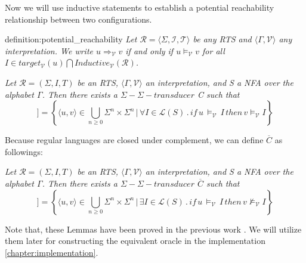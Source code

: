 Now we will use inductive statements to establish a potential reachability relationship between two configurations.

\begin{theo}{definition:potential_reachability}
    \textit{
   Let $\mathcal{R} = \langle \Sigma, \mathcal{I}, \mathcal{T} \rangle$ be any \textit{RTS}
   and $\langle \Gamma, \mathcal{V} \rangle$ any interpretation.
   We write $u \Rightarrow_{\mathcal{V}} v$ if and only if $u \models_{\mathcal{V}} v$
   for all $I \in target_\mathcal{V}(u) \bigcap Inductive_\mathcal{V}(\mathcal{R})$.
   }
\end{theo}

\begin{lemma}\label{lemma:abstractly_reachable}
    
\end{lemma}
\textit{
    Let $\mathcal{R} = (\Sigma, I, T)$ be an RTS, $\langle \Gamma, \mathcal{V} \rangle$ an interpretation, 
    and S a NFA over the alphabet $\Gamma$. Then there exists a  $\Sigma-\Sigma-transducer$ C such that
}
\begin{equation}
    [[C]] = \left\lbrace \langle u,v\rangle \in \bigcup_{n \geq 0} \Sigma^n \times \Sigma^n \, | \, \forall I \in \mathcal{L}(S) \, . \, if \, u \, \models_{\mathcal{V}} \, I \, then \, v \models_{\mathcal{V}} I \right\rbrace
\end{equation}

Because regular languages are closed under complement, we can define $\overline{C}$ as followings:
\begin{lemma}\label{lemma:abstractly_reachable2}
    
\end{lemma}
\textit{
    Let $\mathcal{R} = (\Sigma, I, T)$ be an RTS, $\langle \Gamma, \mathcal{V} \rangle$ an interpretation, 
    and S a NFA over the alphabet $\Gamma$. Then there exists a  $\Sigma-\Sigma-transducer$ $\overline{C}$ such that
}
\begin{equation}
    [[\overline{C}]] = \left\lbrace \langle u,v\rangle \in \bigcup_{n \geq 0} \Sigma^n \times \Sigma^n \, | \, \exists I \in \mathcal{L}(S) \, . \, if \, u \, \models_{\mathcal{V}} \, I \, then \, v \not\models_{\mathcal{V}} I \right\rbrace
\end{equation}

Note that, these Lemmas have been proved in the previous work \cite*{Welzel2023InductiveSts}.
We will utilize them later for constructing the equivalent oracle in the implementation \autoref{chapter:implementation}.
